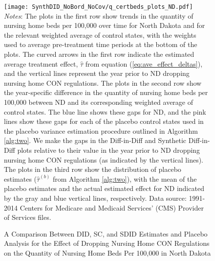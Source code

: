 \documentclass[../Main.tex]{subfiles}
\begin{document}
\newpage
{}
\begin{figure}[t] 
    \setlength{}
	\caption{\label{fig:q_certbeds_plots_nd} \centering A Comparison Between DID, SC, and SDID Estimates and Placebo Analysis for the Effect of Dropping Nursing Home CON Regulations on the Quantity of Nursing Home Beds Per 100,000 in North Dakota} {\centering\texttt{[image: SynthDID\_NoBord\_NoCov/q\_certbeds\_plots\_ND.pdf]}}
    \vspace{-1.4cm}\\
    \scriptsize
		\textit{Notes}: The plots in the first row show trends in the quantity of nursing home beds per 100,000 over time for North Dakota and for the relevant weighted average of control states, with the weights used to average pre-treatment time periods at the bottom of the plots. The curved arrows in the first row indicate the estimated average treatment effect, $\hat{\tau}$ from equation (\ref{eq:ave_effect_deltas}), and the vertical lines represent the year prior to ND dropping nursing home CON regulations. The plots in the second row show the year-specific difference in the quantity of nursing home beds per 100,000 between ND and its corresponding weighted average of control states. The blue line shows these gaps for ND, and the pink lines show these gaps for each of the placebo control states used in the placebo variance estimation procedure outlined in Algorithm \ref{alg:two}. We make the gaps in the Diff-in-Diff and Synthetic Diff-in-Diff plots relative to their value in the year prior to ND dropping nursing home CON regulations (as indicated by the vertical lines). The plots in the third row show the distribution of placebo estimates ($\hat{\tau}^{(b)}$ from Algorithm \ref{alg:two}), with the mean of the placebo estimates and the actual estimated effect for ND indicated by the gray and blue vertical lines, respectively. Data source: 1991-2014 Centers for Medicare and Medicaid Services’ (CMS) Provider of Services files.
\end{figure}
\restoregeometry
\clearpage
\end{document}
